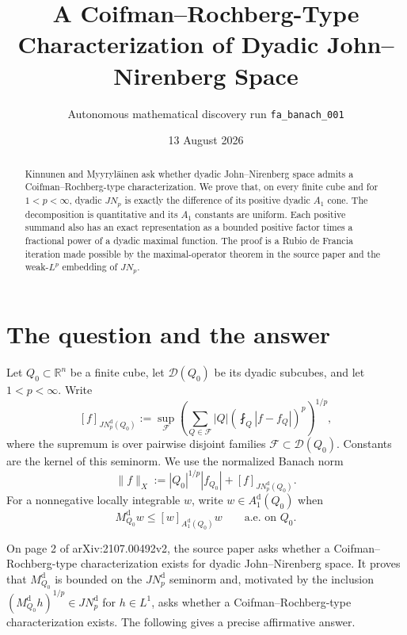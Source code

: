 \documentclass[11pt]{article}
\title{A Coifman--Rochberg-Type Characterization of Dyadic
John--Nirenberg Space}
\author{Autonomous mathematical discovery run \texttt{fa\_banach\_001}}
\date{13 August 2026}
\newcommand{\avg}{\mathop{\fint}}
\newcommand{\D}{\mathcal D}
\newcommand{\M}{M^{\mathrm d}_{Q_0}}
\newcommand{\JN}{JN^{\mathrm d}_p(Q_0)}
\newcommand{\Aone}{A^{\mathrm d}_1(Q_0)}
\begin{document}
\maketitle

\begin{abstract}
Kinnunen and Myyryl\"ainen ask whether dyadic John--Nirenberg space admits a
Coifman--Rochberg-type characterization.  We prove that, on every finite cube
and for $1<p<\infty$, dyadic $JN_p$ is exactly the difference of its positive
dyadic $A_1$ cone.  The decomposition is quantitative and its $A_1$ constants
are uniform.  Each positive summand also has an exact representation as a
bounded positive factor times a fractional power of a dyadic maximal
function.  The proof is a Rubio de Francia iteration made possible by the
maximal-operator theorem in the source paper and the weak-$L^p$ embedding of
$JN_p$.
\end{abstract}

\section{The question and the answer}

Let $Q_0\subset\mathbb R^n$ be a finite cube, let $\D(Q_0)$ be its dyadic
subcubes, and let $1<p<\infty$.  Write
\[
 [f]_{\JN}:=
 \sup_{\mathcal F}
 \left(\sum_{Q\in\mathcal F}|Q|
   \left(\avg_Q|f-f_Q|\right)^p\right)^{1/p},
\]
where the supremum is over pairwise disjoint families
$\mathcal F\subset\D(Q_0)$.  Constants are the kernel of this seminorm.  We
use the normalized Banach norm
\begin{equation}\label{eq:Xnorm}
 \|f\|_X:=|Q_0|^{1/p}|f_{Q_0}|+[f]_{\JN}.
\end{equation}
For a nonnegative locally integrable $w$, write $w\in\Aone$ when
\[
 \M w\leq [w]_{\Aone}w\qquad\text{a.e. on }Q_0.
\]

On page 2 of arXiv:2107.00492v2, the source paper asks whether a
Coifman--Rochberg-type characterization exists for dyadic John--Nirenberg
space.  It proves that $\M$ is bounded on the $JN_p^{\mathrm d}$ seminorm
and, motivated by the inclusion
$(\M h)^{1/p}\in JN_p^{\mathrm d}$ for $h\in L^1$, asks whether a
Coifman--Rochberg-type characterization exists.  The following gives a
precise affirmative answer.
\end{document}

